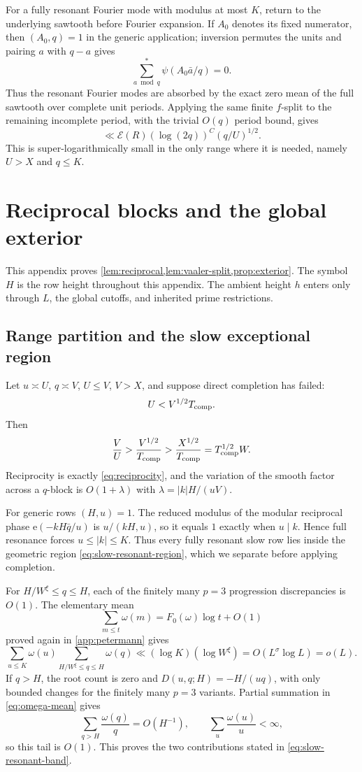 \documentclass[11pt]{article}
\theoremstyle{definition}
\theoremstyle{remark}
\newcommand{\Ecal}{\mathcal E}
\newcommand{\e}{\mathrm e}
\newcommand{\1}{\mathbf 1}
\newcommand{\om}{\omega}
\begin{document}
For a fully resonant Fourier mode with modulus at most $K$, return to the underlying sawtooth before Fourier expansion.  If $A_0$ denotes its fixed numerator, then $(A_0,q)=1$ in the generic application; inversion permutes the units and pairing $a$ with $q-a$ gives
\[
\sum_{a\bmod q}^{*}\psi(A_0\bar a/q)=0.
\]
Thus the resonant Fourier modes are absorbed by the exact zero mean of the full sawtooth over complete unit periods.  Applying the same finite $f$-split to the remaining incomplete period, with the trivial $O(q)$ period bound, gives
\[
\ll \Ecal(R)(\log(2q))^C(q/U)^{1/2}.
\]
This is super-logarithmically small in the only range where it is needed, namely $U>X$ and $q\le K$.

\section{Reciprocal blocks and the global exterior}\label{app:reciprocal}

This appendix proves \cref{lem:reciprocal,lem:vaaler-split,prop:exterior}.  The symbol $H$ is the row height throughout this appendix.  The ambient height $h$ enters only through $L$, the global cutoffs, and inherited prime restrictions.

\subsection{Range partition and the slow exceptional region}
Let $u\asymp U$, $q\asymp V$, $U\le V$, $V>X$, and suppose direct completion has failed:
\[
U<V^{1/2}T_{\rm comp}.
\]
Then
\begin{equation}\label{eq:app-ratio}
\frac VU>\frac{V^{1/2}}{T_{\rm comp}}
>\frac{X^{1/2}}{T_{\rm comp}}
=T_{\rm comp}^{1/2}W.
\end{equation}
Reciprocity is exactly \cref{eq:reciprocity}, and the variation of the smooth factor across a $q$-block is $O(1+\lambda)$ with
$\lambda=|k|H/(uV)$.

For generic rows $(H,u)=1$.  The reduced modulus of the modular reciprocal phase
$\e(-kH\bar q/u)$ is $u/(kH,u)$, so it equals $1$ exactly when $u\mid k$.  Hence full resonance forces $u\le|k|\le K$.  Thus every fully resonant slow row lies inside the geometric region \cref{eq:slow-resonant-region}, which we separate before applying completion.

For $H/W^\xi\le q\le H$, each of the finitely many $p=3$ progression discrepancies is $O(1)$.  The elementary mean
\begin{equation}\label{eq:omega-mean}
\sum_{m\le t}\om(m)=F_0(\om)\log t+O(1)
\end{equation}
proved again in \cref{app:petermann} gives
\[
\sum_{u\le K}\om(u)
\sum_{H/W^\xi\le q\le H}\om(q)
\ll(\log K)(\log W^\xi)
=O(L^\sigma\log L)=o(L).
\]
If $q>H$, the root count is zero and
$D(u,q;H)=-H/(uq)$, with only bounded changes for the finitely many $p=3$ variants.  Partial summation in \cref{eq:omega-mean} gives
\[
\sum_{q>H}\frac{\om(q)}q=O(H^{-1}),
\qquad
\sum_u\frac{\om(u)}u<\infty,
\]
so this tail is $O(1)$.  This proves the two contributions stated in \cref{eq:slow-resonant-band}.
\end{document}
